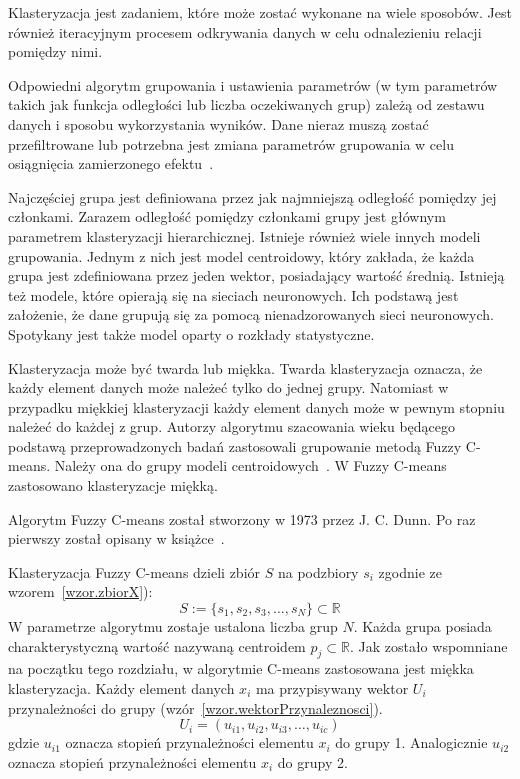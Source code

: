 \documentclass[a4paper,twoside,12pt]{book}
\begin{document}
    Klasteryzacja jest zadaniem, które może zostać wykonane na wiele sposobów.
    Jest również iteracyjnym procesem odkrywania danych w celu odnalezieniu relacji pomiędzy nimi.

    Odpowiedni algorytm grupowania i ustawienia parametrów (w tym parametrów
    takich jak funkcja odległości lub liczba oczekiwanych grup)
    zależą od zestawu danych i sposobu wykorzystania wyników.
    Dane nieraz muszą zostać przefiltrowane lub potrzebna jest zmiana parametrów grupowania w celu osiągnięcia
    zamierzonego efektu~\cite{clusterWstep}.

    Najczęściej grupa jest definiowana przez jak najmniejszą odległość pomiędzy jej członkami.
    Zarazem odległość pomiędzy członkami grupy jest głównym parametrem klasteryzacji hierarchicznej.
    Istnieje również wiele innych modeli grupowania.
    Jednym z nich jest model centroidowy,
    który zakłada, że każda grupa jest zdefiniowana przez jeden wektor, posiadający wartość średnią.
    Istnieją też modele, które opierają się na sieciach neuronowych.
    Ich podstawą jest założenie, że dane grupują się za pomocą nienadzorowanych sieci neuronowych.
    Spotykany jest także model oparty o rozkłady statystyczne.

    Klasteryzacja może być twarda lub miękka.
    Twarda klasteryzacja oznacza, że każdy element danych może należeć tylko do jednej grupy.
    Natomiast w przypadku miękkiej klasteryzacji każdy element danych może w pewnym stopniu należeć do każdej z grup.
    Autorzy algorytmu szacowania wieku będącego podstawą przeprowadzonych badań zastosowali grupowanie metodą Fuzzy
    C-means.
    Należy ona do grupy modeli centroidowych~\cite{clusterWstep}. W Fuzzy C-means zastosowano klasteryzacje miękką.

    Algorytm Fuzzy C-means został stworzony w 1973 przez J. C. Dunn. Po raz pierwszy został opisany w
    książce~\cite{ISODATA}.

    Klasteryzacja Fuzzy C-means dzieli zbiór $S$ na podzbiory $s_{i}$ zgodnie ze wzorem~\ref{wzor.zbiorX}):
    \large
    \begin{equation}
        S:=\{s_{1},s_{2},s_{3},\ldots,s_{N}\}\subset \mathbb{R}
        \label{wzor.zbiorX}
    \end{equation}
    \normalsize
    W parametrze algorytmu zostaje ustalona liczba grup $N$.
    Każda grupa posiada charakterystyczną wartość nazywaną centroidem $p_{j}\subset \mathbb{R}$.
    Jak zostało wspomniane na początku tego rozdziału, w algorytmie C-means zastosowana jest miękka klasteryzacja.
    Każdy element danych $x_{i}$ ma przypisywany wektor $U_{i}$ przynależności do grupy
    (wzór~\ref{wzor.wektorPrzynaleznosci}).
    \large
    \begin{equation}
        U_{i}=(u_{i1}, u_{i2}, u_{i3}, \ldots, u_{ic})
        \label{wzor.wektorPrzynaleznosci}
    \end{equation}
    \normalsize
    gdzie $u_{i1}$ oznacza stopień przynależności elementu $x_{i}$ do grupy 1.
    Analogicznie $u_{i2}$ oznacza stopień przynależności elementu $x_{i}$ do grupy 2.
\end{document}
